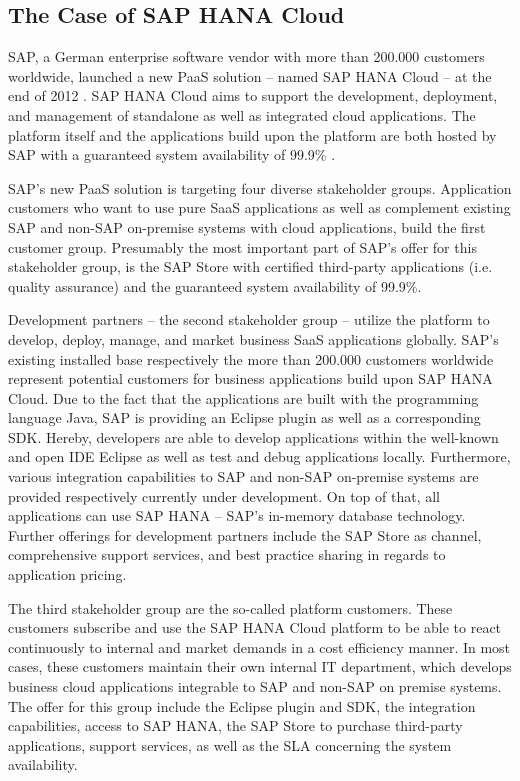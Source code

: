 \newpage


\subsection{The Case of SAP HANA Cloud}\label{ch:sota:sap}

SAP, a German enterprise software vendor with more than 200.000 customers worldwide, launched a new \ac{PaaS} solution -- named SAP HANA Cloud -- at the end of 2012 \citep{SAP2013b,SAP2013a}. SAP HANA Cloud aims to support the development, deployment, and management of standalone as well as integrated cloud applications. The platform itself and the applications build upon the platform are both hosted by SAP with a guaranteed system availability of 99.9\% \citep{SAP2013b}.

SAP's new \ac{PaaS} solution is targeting four diverse stakeholder groups. Application customers who want to use pure \ac{SaaS} applications as well as complement existing SAP and non-SAP on-premise systems with cloud applications, build the first customer group. Presumably the most important part of SAP's offer for this stakeholder group, is the SAP Store with certified third-party applications (i.e. quality assurance) and the guaranteed system availability of 99.9\%.

Development partners -- the second stakeholder group -- utilize the platform to develop, deploy, manage, and market business \ac{SaaS} applications globally. SAP's existing installed base respectively the more than 200.000 customers worldwide represent potential customers for business applications build upon SAP HANA Cloud. Due to the fact that the applications are built with the programming language Java, SAP is providing an Eclipse plugin as well as a corresponding \ac{SDK}. Hereby, developers are able to develop applications within the well-known and open \ac{IDE} Eclipse as well as test and debug applications locally. Furthermore, various integration capabilities to SAP and non-SAP on-premise systems are provided respectively currently under development. On top of that, all applications can use SAP HANA -- SAP's in-memory database technology. Further offerings for development partners include the SAP Store as channel, comprehensive support services, and best practice sharing in regards to application pricing.

The third stakeholder group are the so-called platform customers. These customers subscribe and use the SAP HANA Cloud platform to be able to react continuously to internal and market demands in a cost efficiency manner. In most cases, these customers maintain their own internal \ac{IT} department, which develops business cloud applications integrable to SAP and non-SAP on premise systems. The offer for this group include the Eclipse plugin and \ac{SDK}, the integration capabilities, access to SAP HANA, the SAP Store to purchase third-party applications, support services, as well as the \ac{SLA} concerning the system availability.

